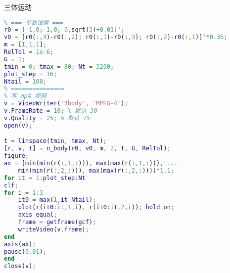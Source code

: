 三体运动
\begin{lstlisting}[language=matlab, caption=three\_body.m]
% 平面三体运动演示
% === 参数设置 ===
r0 = [-1,0; 1,0; 0,sqrt(3)+0.01]';
v0 = [r0(:,3)-r0(:,2); r0(:,1)-r0(:,3); r0(:,2)-r0(:,1)]'*0.35;
m = [1,1,1];
RelTol = 1e-6;
G = 1;
tmin = 0; tmax = 80; Nt = 3200;
plot_step = 16;
Ntail = 100;
% ===============
% 写 mp4 视频
v = VideoWriter('3body', 'MPEG-4');
v.FrameRate = 10; % 默认 30
v.Quality = 25; % 默认 75
open(v);

t = linspace(tmin, tmax, Nt);
[r, v, t] = n_body(r0, v0, m, 2, t, G, RelTol);
figure;
ax = [min(min(r(:,1,:))), max(max(r(:,1,:))), ...
    min(min(r(:,2,:))), max(max(r(:,2,:)))]*1.1;
for it = 1:plot_step:Nt
clf;
for i = 1:3
    it0 = max(1,it-Ntail);
    plot(r(it0:it,1,i), r(it0:it,2,i)); hold on;
    axis equal;
    frame = getframe(gcf);
    writeVideo(v,frame);
end
axis(ax);
pause(0.01);
end
close(v);
\end{lstlisting}
